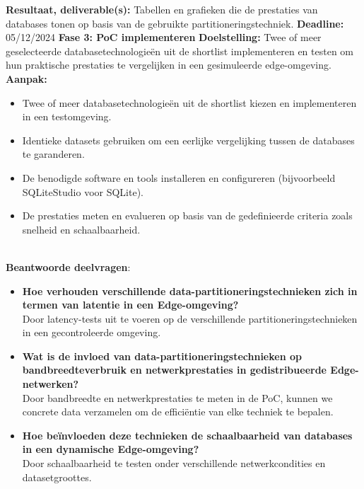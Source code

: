     \textbf{Resultaat, deliverable(s):} Tabellen en grafieken die de prestaties van databases tonen op basis van de gebruikte partitioneringstechniek.\newline\newline
    \textbf{Deadline:} 05/12/2024\newline\newline
\textbf{Fase 3: PoC implementeren}\newline\newline
    \textbf{Doelstelling:} Twee of meer geselecteerde databasetechnologieën uit de shortlist implementeren en testen om hun praktische prestaties te vergelijken in een gesimuleerde edge-omgeving.\newline\newline
    \textbf{Aanpak:}
    \begin{itemize}
        \item Twee of meer databasetechnologieën uit de shortlist kiezen en implementeren in een testomgeving.
        \item Identieke datasets gebruiken om een eerlijke vergelijking tussen de databases te garanderen.
        \item De benodigde software en tools installeren en configureren (bijvoorbeeld SQLiteStudio voor SQLite).
        \item De prestaties meten en evalueren op basis van de gedefinieerde criteria zoals snelheid en schaalbaarheid.\\ \\
    \end{itemize}
    \textbf{Beantwoorde deelvragen}:
    \begin{itemize}
    \item \textbf{Hoe verhouden verschillende data-partitioneringstechnieken zich in termen van latentie in een Edge-omgeving?} \\
      Door latency-tests uit te voeren op de verschillende partitioneringstechnieken in een gecontroleerde omgeving.
    \item \textbf{Wat is de invloed van data-partitioneringstechnieken op bandbreedteverbruik en netwerkprestaties in gedistribueerde Edge-netwerken?} \\
      Door bandbreedte en netwerkprestaties te meten in de PoC, kunnen we concrete data verzamelen om de efficiëntie van elke techniek te bepalen.
    \item \textbf{Hoe beïnvloeden deze technieken de schaalbaarheid van databases in een dynamische Edge-omgeving?} \\
      Door schaalbaarheid te testen onder verschillende netwerkcondities en datasetgroottes.
    \end{itemize}
